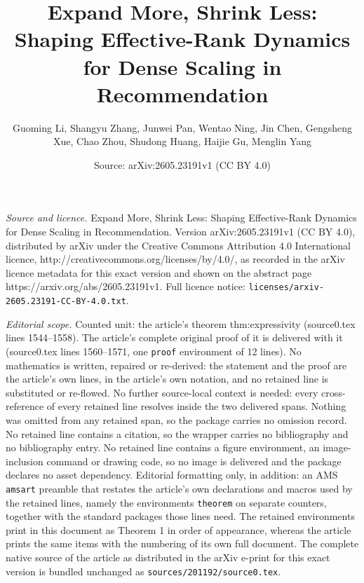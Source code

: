 \documentclass[10pt,a4paper]{amsart}
\title{Expand More, Shrink Less: Shaping Effective-Rank Dynamics for Dense Scaling in Recommendation}
\author{Guoming Li, Shangyu Zhang, Junwei Pan, Wentao Ning, Jin Chen, Gengsheng Xue, Chao Zhou, Shudong Huang, Haijie Gu, Menglin Yang}
\date{Source: arXiv:2605.23191v1 (CC BY 4.0)}
\begin{document}
\maketitle

\noindent\emph{Source and licence.} Expand More, Shrink Less: Shaping Effective-Rank Dynamics for Dense Scaling in Recommendation. Version arXiv:2605.23191v1 (CC BY 4.0), distributed by arXiv under the Creative Commons Attribution 4.0 International licence, http://creativecommons.org/licenses/by/4.0/, as recorded in the arXiv licence metadata for this exact version and shown on the abstract page https://arxiv.org/abs/2605.23191v1. Full licence notice: \texttt{licenses/arxiv-2605.23191-CC-BY-4.0.txt}.\par\smallskip

\noindent\textit{Editorial scope.} Counted unit: the article's theorem thm:expressivity (source0.tex lines 1544--1558). The article's complete original proof of it is delivered with it (source0.tex lines 1560--1571, one \texttt{proof} environment of 12 lines). No mathematics is written, repaired or re-derived: the statement and the proof are the article's own lines, in the article's own notation, and no retained line is substituted or re-flowed.  No further source-local context is needed: every cross-reference of every retained line resolves inside the two delivered spans.  Nothing was omitted from any retained span, so the package carries no omission record.  No retained line contains a citation, so the wrapper carries no bibliography and no bibliography entry.  No retained line contains a figure environment, an image-inclusion command or drawing code, so no image is delivered and the package declares no asset dependency.  Editorial formatting only, in addition: an AMS \texttt{amsart} preamble that restates the article's own declarations and macros used by the retained lines, namely the environments \texttt{theorem} on separate counters, together with the standard packages those lines need.  The retained environments print in this document as Theorem 1 in order of appearance, whereas the article prints the same items with the numbering of its own full document.  The complete native source of the article as distributed in the arXiv e-print for this exact version is bundled unchanged as \texttt{sources/201192/source0.tex}.
\end{document}
